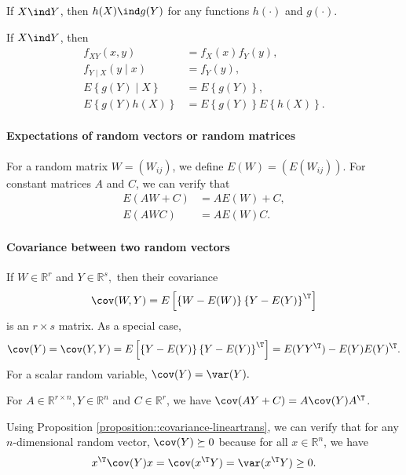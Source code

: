 \begin{proposition}
 If $X\ind Y$, then $h(X)\ind g(Y)$ for any functions
$h(\cdot)$ and $g(\cdot)$.
\end{proposition}

\begin{proposition}
If $X\ind Y$, then
\begin{align*}
f_{XY}(x,y) & =f_{X}(x)f_{Y}(y),\\
f_{Y\mid X}(y\mid x) & =f_{Y}(y),\\
E\left\{ g(Y)\mid X\right\}  & =E\left\{ g(Y)\right\} ,\\
E\left\{ g(Y)h(X)\right\}  & =E\left\{ g(Y)\right\} E\left\{ h(X)\right\} .
\end{align*}
\end{proposition}



\paragraph*{Expectations of random vectors or random matrices}

For a random matrix $W=(W_{ij})$, we define $E(W)=(E(W_{ij}))$.
For constant matrices $A$ and $C$, we can verify that
\begin{align*}
E(AW+C) & =AE(W)+C,\\
E(AWC) & =AE(W)C.
\end{align*}


\paragraph*{Covariance between two random vectors}

If $W\in\mathbb{R}^{r}$ and $Y\in\mathbb{R}^{s},$ then their covariance 
$$
\cov(W,Y)=E\left[\left\{ W-E(W)\right\} \left\{ Y-E(Y)\right\} ^{\T}\right]
$$
is an $r\times s$ matrix. 
As a special case, 
$$
\cov(Y)=\cov(Y,Y)=E\left[\left\{ Y-E(Y)\right\} \left\{ Y-E(Y)\right\} ^{\T}\right]
= E(YY^{\T}) - E(Y) E(Y)^{\T}. 
$$
For a scalar random variable, $\cov(Y)=\var(Y).$

\begin{proposition}\label{proposition::covariance-lineartrans}
For $A\in \mathbb{R}^{r\times n},Y\in\mathbb{R}^{n}$ and
$C\in\mathbb{R}^{r}$, we have $\cov(AY+C)=A\cov(Y)A^{\T}$.
\end{proposition}

Using Proposition \ref{proposition::covariance-lineartrans},
we can verify that for any $n$-dimensional random vector, $\cov(Y)\succeq0$
because for all $x\in\mathbb{R}^{n}$, we have 
\[
x^{\T}\cov(Y)x=\cov(x^{\T}Y)=\var(x^{\T}Y)\geq0.
\]

